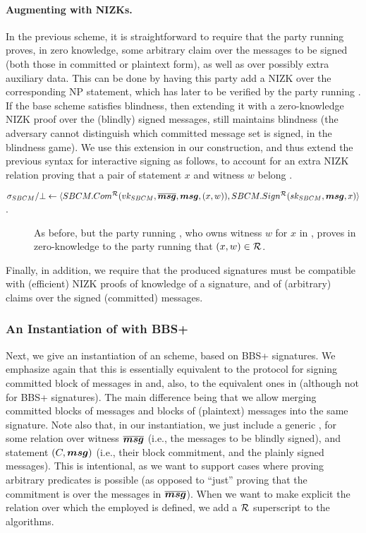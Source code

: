 \paragraph{Augmenting with NIZKs.} %
In the previous \SBCM scheme, it is straightforward to require that the party
running \SBCMCom proves, in zero knowledge, some arbitrary claim over the
messages to be signed (both those in committed or plaintext form), as well as
over possibly extra auxiliary data. This can be done by having this party add a
NIZK over the corresponding NP statement, which has later to be verified by the
party running \SBCMSign.
%
If the base \SBCM scheme satisfies blindness, then extending it with a
zero-knowledge NIZK proof over the (blindly) signed messages, still maintains
blindness (the adversary cannot distinguish which committed message set is
signed, in the blindness game).
%
We use this extension in our \CUASGen construction, and thus extend the previous
syntax for interactive signing  as follows, to account for an extra NIZK
relation \NIZKRel proving that a pair of statement $x$ and witness $w$ belong
\NIZKRel.

\begin{description}
\item[$\sigma_{SBCM}/\bot \gets \langle SBCM.Com^{\mathcal{R}}(vk_{SBCM},\overline{\boldsymbol{msg}},
  \boldsymbol{msg},(x,w)),SBCM.Sign^{\mathcal{R}}(sk_{SBCM},\boldsymbol{msg},x) \rangle$.] As before, but
  the party running \SBCMCom, who owns witness $w$ for $x$ in \NIZKRel, proves
  in zero-knowledge to the party running \SBCMSign that $(x,w) \in \mathcal{R}$.
\end{description}

Finally, in addition, we require that the produced signatures must be compatible
with (efficient) NIZK proofs of knowledge of a signature, and of (arbitrary)
claims over the signed (committed) messages.

\subsubsection{An Instantiation of \SBCM with BBS+}

Next, we give an instantiation of an \SBCM scheme, based on BBS+ signatures.
We emphasize again that this is essentially equivalent to the protocol for
signing committed block of messages in \cite{asm06} and, also, to the equivalent
ones in \cite{cl02,ps16} (although not for BBS+ signatures). The main difference
being that we allow merging committed blocks of messages and blocks of
(plaintext) messages into the same signature.
%
Note also that, in our instantiation, we just include a generic \NIZK, for some
relation over witness $\overline{\boldsymbol{msg}}$ (i.e., the messages to be blindly
signed), and statement $(C,\boldsymbol{msg})$ (i.e., their block commitment, and the
plainly signed messages). This is intentional, as we want to support cases where
proving arbitrary predicates is possible (as opposed to ``just'' proving that
the commitment is over the messages in $\overline{\boldsymbol{msg}}$).
%
When we want to make explicit the relation over which the employed \NIZK is
defined, we add a $\mathcal{R}$ superscript to the algorithms.

